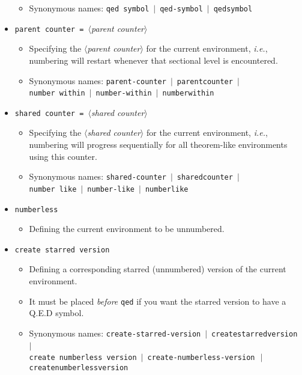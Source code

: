 \documentclass[classical]{einfart}
\newcommand{\meta}[1]{$\langle${\normalfont\itshape#1}$\rangle$}
\newcommand{\commandoption}[1]{\texttt{\textcolor{code-keys}{#1}}}
\begin{document}
\begin{itemize}[label=,leftmargin=1.25em,itemindent=-1.25em]
\begin{itemize}
            \item Synonymous names: \commandoption{qed symbol} \,$|$\, \commandoption{qed-symbol} \,$|$\, \commandoption{qedsymbol}
        \end{itemize}
    \item \commandoption{parent counter}\lstinline| = |\meta{parent counter}
        \begin{itemize}
            \item Specifying the \meta{parent counter} for the current environment, \emph{i.e.}, numbering will restart whenever that sectional level is encountered.
            \item Synonymous names: \commandoption{parent-counter} \,$|$\, \commandoption{parentcounter} \,$|$\, \\\phantom{Synonymous names: }\commandoption{number within} \,$|$\, \commandoption{number-within} \,$|$\, \commandoption{numberwithin}
        \end{itemize}
    \item \commandoption{shared counter}\lstinline| = |\meta{shared counter}
        \begin{itemize}
            \item Specifying the \meta{shared counter} for the current environment, \emph{i.e.}, numbering will progress sequentially for all theorem-like environments using this counter.
            \item Synonymous names: \commandoption{shared-counter} \,$|$\, \commandoption{sharedcounter} \,$|$\, \\\phantom{Synonymous names: }\commandoption{number like} \,$|$\, \commandoption{number-like} \,$|$\, \commandoption{numberlike}
        \end{itemize}
    \item \commandoption{numberless}
        \begin{itemize}
            \item Defining the current environment to be unnumbered.
        \end{itemize}
    \item \commandoption{create starred version}
        \begin{itemize}
            \item Defining a corresponding starred (unnumbered) version of the current environment.
            \item It must be placed \emph{before} \commandoption{qed} if you want the starred version to have a Q.E.D symbol.
            \item Synonymous names: \commandoption{create-starred-version} \,$|$\, \commandoption{createstarredversion} \,$|$\, \\\phantom{Synonymous names: }\commandoption{create numberless version} \,$|$\, \commandoption{create-numberless-version}~\,$|$\\\phantom{Synonymous names: }\commandoption{createnumberlessversion}

\end{itemize}
\end{itemize}
\end{document}

